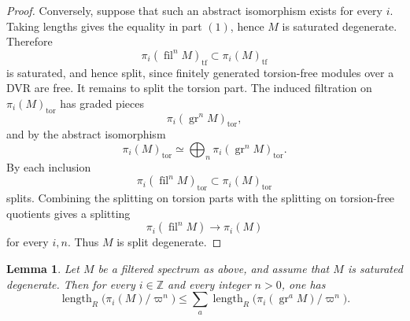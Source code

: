 \documentclass[11pt]{amsart}
\newtheorem{lemma}{Lemma}[section]
\numberwithin{equation}{section}
\newcommand{\tf}{\operatorname{tf}}
\newcommand{\len}{\operatorname{length}}
\newcommand{\tors}{\operatorname{tor}}
\newcommand{\gr}{{\operatorname{gr}}}
\newcommand{\fil}{{\operatorname{fil}}}
\numberwithin{equation}{section}
\begin{document}
\begin{proof}
Conversely, suppose that such an abstract isomorphism exists for every $i$.
Taking lengths gives the equality in part $(1)$, hence $M$ is saturated
degenerate. Therefore
\begin{equation*}
  \pi_i(\fil^nM)_{\tf}\subset \pi_i(M)_{\tf}
\end{equation*}
is saturated, and hence split, since finitely generated torsion-free modules
over a DVR are free. It remains to split the torsion part. The induced
filtration on $\pi_i(M)_{\tors}$ has graded pieces
\begin{equation*}
  \pi_i(\gr^nM)_{\tors},
\end{equation*}
and by the abstract isomorphism
\begin{equation*}
  \pi_i(M)_{\tors}
  \simeq
  \bigoplus_n \pi_i(\gr^nM)_{\tors}.
\end{equation*}
By \cite[Corollary 2.11]{L22} each inclusion
\begin{equation*}
  \pi_i(\fil^nM)_{\tors}
  \subset
  \pi_i(M)_{\tors}
\end{equation*}
splits. Combining the splitting on torsion parts with the splitting on
torsion-free quotients gives a splitting
\begin{equation*}
  \pi_i(\fil^nM)\longrightarrow \pi_i(M)
\end{equation*}
for every $i,n$. Thus $M$ is split degenerate.
\end{proof}

\begin{lemma}\label{lenfil}
Let $M$ be a filtered spectrum as above, and assume that $M$ is saturated degenerate.
Then for every $i\in \mathbb Z$ and every integer $n>0$, one has
\begin{equation*}
  \len_R\bigl(\pi_i(M)/\varpi^n\bigr)
  \leq
  \sum_a \len_R\bigl(\pi_i(\gr^a M)/\varpi^n\bigr).
\end{equation*}
\end{lemma}
\end{document}
